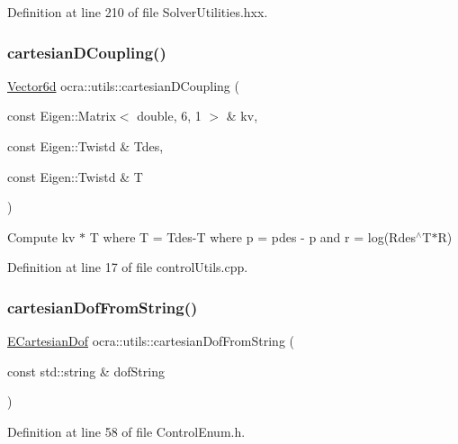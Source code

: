 Definition at line 210 of file Solver\+Utilities.\+hxx.

\hypertarget{namespaceocra_1_1utils_aea2b40d346ee7532a6cdb9392e7c5767}{}\label{namespaceocra_1_1utils_aea2b40d346ee7532a6cdb9392e7c5767} 
\subsubsection{\texorpdfstring{cartesian\+D\+Coupling()}{cartesianDCoupling()}}
{\footnotesize\ttfamily \hyperlink{namespaceocra_a72fe7d6cf8411efbfc475a3a78209867}{Vector6d} ocra\+::utils\+::cartesian\+D\+Coupling (\begin{DoxyParamCaption}\item[{const Eigen\+::\+Matrix$<$ double, 6, 1 $>$ \&}]{kv,  }\item[{const Eigen\+::\+Twistd \&}]{Tdes,  }\item[{const Eigen\+::\+Twistd \&}]{T }\end{DoxyParamCaption})}

Compute kv $\ast$  T where  T = Tdes-\/T where  p = pdes -\/ p and  r = log(\+Rdes$^\wedge$\+T$\ast$\+R) 

Definition at line 17 of file control\+Utils.\+cpp.

\hypertarget{namespaceocra_1_1utils_acfe425f7bacb0a3c69e868e7f368d99c}{}\label{namespaceocra_1_1utils_acfe425f7bacb0a3c69e868e7f368d99c} 
\subsubsection{\texorpdfstring{cartesian\+Dof\+From\+String()}{cartesianDofFromString()}}
{\footnotesize\ttfamily \hyperlink{namespaceocra_a436781c7059a0f76027df1c652126260}{E\+Cartesian\+Dof} ocra\+::utils\+::cartesian\+Dof\+From\+String (\begin{DoxyParamCaption}\item[{const std\+::string \&}]{dof\+String }\end{DoxyParamCaption})\hspace{0.3cm}{\ttfamily [inline]}}



Definition at line 58 of file Control\+Enum.\+h.

